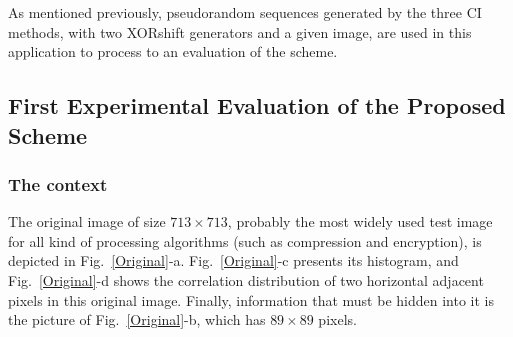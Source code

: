 As mentioned previously, pseudorandom sequences generated by the three CI methods, with two XORshift generators and a given image, are used in this application to process to an evaluation of the scheme.

\subsection{First Experimental Evaluation of the Proposed Scheme}

\subsubsection{The context}

The original image of size $713 \times 713$,
probably the most widely used test image for all kind of processing algorithms (such as compression and encryption),
 is depicted in Fig.~\ref{Original}-a.
Fig.~\ref{Original}-c presents its histogram, and Fig.~\ref{Original}-d shows the correlation distribution of two horizontal adjacent pixels in this original image.
Finally, information that must be hidden into it is the picture of Fig.~\ref{Original}-b, which has $89 \times 89$ pixels.

